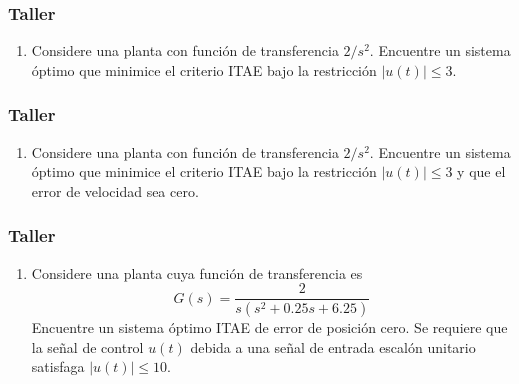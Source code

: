 \documentclass[aspectratio=169,handout]{beamer}
\theoremstyle{definition}
\theoremstyle{plain}
\theoremstyle{remark}
\newcounter{saveenumi}
\newcommand{\seti}{\setcounter{saveenumi}{\value{enumi}}}
\newcommand{\conti}{\setcounter{enumi}{\value{saveenumi}}}
\begin{document}
\begin{frame}[c]\frametitle{Taller}
\begin{enumerate}
	\conti
	\item Considere una planta con función de transferencia $2/s^2$. Encuentre un sistema óptimo que minimice el criterio ITAE bajo la restricción $|u(t)| \leq 3$.
	\seti
\end{enumerate}
\end{frame}

\begin{frame}[c]\frametitle{Taller}
\begin{enumerate}
	\conti
	\item Considere una planta con función de transferencia $2/s^2$. Encuentre un sistema óptimo que minimice el criterio ITAE bajo la restricción $|u(t)| \leq 3$ y que el error de velocidad sea cero.
	\seti
\end{enumerate}
\end{frame}

\begin{frame}[c]\frametitle{Taller}
\begin{enumerate}
	\conti
	\item Considere una planta cuya función de transferencia es
		\begin{equation*}
			G(s) = \frac{2}{s(s^2 + 0.25s + 6.25)}
		\end{equation*}
		Encuentre un sistema óptimo ITAE de error de posición cero. Se requiere que la señal de control $u(t)$ debida a una señal de entrada escalón unitario satisfaga $|u(t)| \leq 10$.
	\seti
\end{enumerate}
\end{frame}
\end{document}
